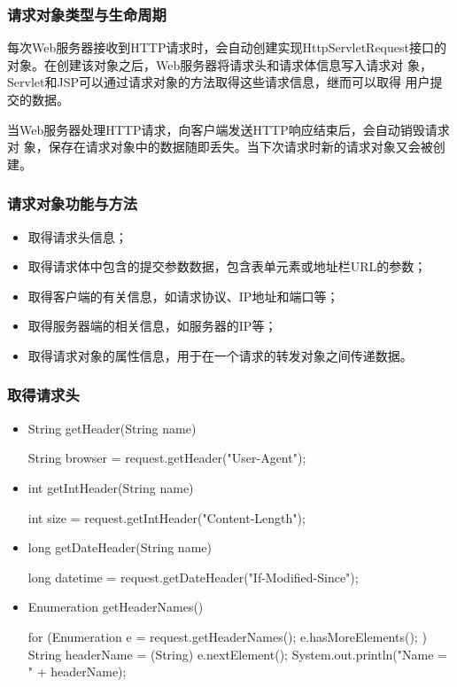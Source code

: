 \begin{frame}
  \frametitle{请求对象类型与生命周期} 

  每次Web服务器接收到HTTP请求时，会自动创建实现HttpServletRequest接口的
  对象。在创建该对象之后，Web服务器将请求头和请求体信息写入请求对
  象，Servlet和JSP可以通过请求对象的方法取得这些请求信息，继而可以取得
  用户提交的数据。


  当Web服务器处理HTTP请求，向客户端发送HTTP响应结束后，会自动销毁请求对
  象，保存在请求对象中的数据随即丢失。当下次请求时新的请求对象又会被创
  建。
\end{frame}

\begin{frame}[fragile] %
  \frametitle{请求对象功能与方法} 

  
  \begin{itemize}
  \item 取得请求头信息；
  \item 取得请求体中包含的提交参数数据，包含表单元素或地址栏URL的参数；
  \item 取得客户端的有关信息，如请求协议、IP地址和端口等；
  \item 取得服务器端的相关信息，如服务器的IP等；
  \item 取得请求对象的属性信息，用于在一个请求的转发对象之间传递数据。
  \end{itemize}
\end{frame}

\begin{frame}[fragile] %
  \frametitle{取得请求头} 

  \begin{itemize}
  \item String getHeader(String name)
    \begin{javaCode}
      String browser = request.getHeader("User-Agent");
    \end{javaCode}

  \item int getIntHeader(String name)
    \begin{javaCode}
      int size = request.getIntHeader("Content-Length");
    \end{javaCode}

  \item long getDateHeader(String name)
    \begin{javaCode}
      long datetime = request.getDateHeader("If-Modified-Since");
    \end{javaCode}

  \item Enumeration getHeaderNames()
    
    \begin{javaCode}
      for (Enumeration e = request.getHeaderNames(); e.hasMoreElements(); ) {
        String headerName = (String) e.nextElement();
        System.out.println("Name = " + headerName);
      }
    \end{javaCode}
  \end{itemize}
\end{frame}

